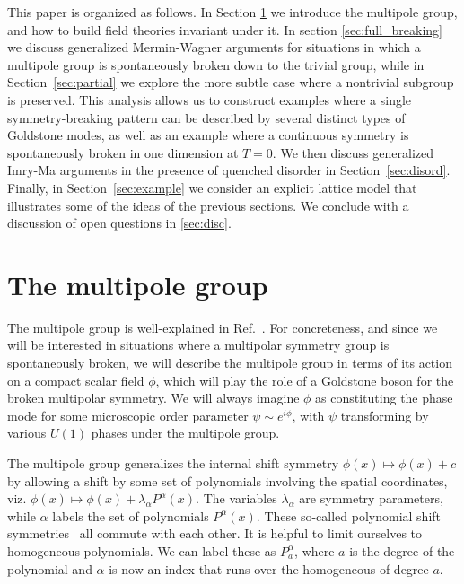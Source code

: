 \documentclass[prb,aps,twocolumn, amsfonts,amsmath,amssymb,nofootinbib,superscriptaddress]{revtex4-2}
\begin{document}
This paper is organized as follows. In Section \ref{multipolegroup} we introduce the multipole group, and how to build field theories invariant under it. In section \ref{sec:full_breaking} we discuss generalized Mermin-Wagner arguments for situations in which a multipole group is spontaneously broken down to the trivial group, while in Section~\ref{sec:partial} we explore the more subtle case where a nontrivial subgroup is preserved. This analysis allows us to construct examples where a single symmetry-breaking pattern can be described by several distinct types of Goldstone modes, as well as an example where a continuous symmetry is spontaneously broken in one dimension at $T=0$. 
We then discuss generalized Imry-Ma arguments in the presence of quenched disorder in Section~\ref{sec:disord}. Finally, in Section~\ref{sec:example} we consider an explicit lattice model that illustrates some of the ideas of the previous sections. We conclude with a discussion of open questions in \ref{sec:disc}.

\section{The multipole group}
\label{multipolegroup}

The multipole group is well-explained in Ref.~\cite{Gromov2019}. For concreteness, and since we will be interested in situations where a multipolar symmetry group is spontaneously broken, we will describe the multipole group in terms of its action on a compact scalar field $\phi$, which will play the role of a Goldstone boson for the broken multipolar symmetry. We will always imagine $\phi$ as constituting the phase mode for some microscopic order parameter $\psi \sim e^{i\phi}$, with $\psi$ transforming by various $U(1)$ phases under the multipole group. 

The multipole group generalizes the internal shift symmetry $\phi(x) \mapsto \phi (x) +c$ by allowing a shift by some set of polynomials involving the spatial coordinates, viz. $\phi (x) \mapsto \phi (x) + \lambda_\alpha P^\alpha(x)$. The variables $\lambda_\alpha$ are symmetry parameters, while $\alpha$ labels the set of polynomials $P^\alpha(x)$. These so-called polynomial shift symmetries~\cite{Griffin2015} all commute with each other. It is helpful to limit ourselves to homogeneous polynomials. We can label these as $P_a^{\alpha}$, where $a$ is the degree of the polynomial and $\alpha$ is now an index that runs over the homogeneous of degree $a$.
\end{document}
